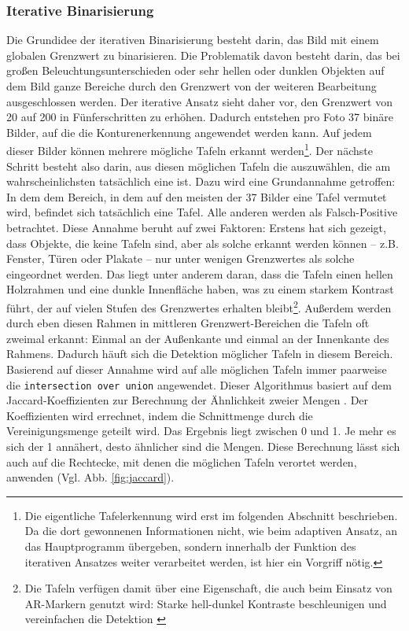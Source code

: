 \subsubsection*{Iterative Binarisierung}

Die Grundidee der iterativen Binarisierung besteht darin, das Bild mit einem globalen Grenzwert zu binarisieren. Die Problematik davon besteht darin, das bei großen Beleuchtungsunterschieden oder sehr hellen oder dunklen Objekten auf dem Bild ganze Bereiche durch den Grenzwert von der weiteren Bearbeitung ausgeschlossen werden. Der iterative Ansatz sieht daher vor, den Grenzwert von 20 auf 200 in Fünferschritten zu erhöhen. Dadurch entstehen pro Foto 37 binäre Bilder, auf die die Konturenerkennung angewendet werden kann. Auf jedem dieser Bilder können mehrere mögliche Tafeln erkannt werden\footnote{Die eigentliche Tafelerkennung wird erst im folgenden Abschnitt beschrieben. Da die dort gewonnenen Informationen nicht, wie beim adaptiven Ansatz, an das Hauptprogramm übergeben, sondern innerhalb der Funktion des iterativen Ansatzes weiter verarbeitet werden, ist hier ein Vorgriff nötig.}. Der nächste Schritt besteht also darin, aus diesen möglichen Tafeln die auszuwählen, die am wahrscheinlichsten tatsächlich eine ist. Dazu wird eine Grundannahme getroffen: In dem dem Bereich, in dem auf den meisten der 37 Bilder eine Tafel vermutet wird, befindet sich tatsächlich eine Tafel. Alle anderen werden als Falsch-Positive betrachtet. Diese Annahme beruht auf zwei Faktoren: Erstens hat sich gezeigt, dass Objekte, die keine Tafeln sind, aber als solche erkannt werden können -- z.B. Fenster, Türen oder Plakate -- nur unter wenigen Grenzwertes als solche eingeordnet werden. Das liegt unter anderem daran, dass die Tafeln einen hellen Holzrahmen und eine dunkle Innenfläche haben, was zu einem starkem Kontrast führt, der auf vielen Stufen des Grenzwertes erhalten bleibt\footnote{Die Tafeln verfügen damit über eine Eigenschaft, die auch beim Einsatz von AR-Markern genutzt wird: Starke hell-dunkel Kontraste beschleunigen und vereinfachen die Detektion \cite[p.~45]{armarker}}. Außerdem werden durch eben diesen Rahmen in mittleren Grenzwert-Bereichen die Tafeln oft zweimal erkannt: Einmal an der Außenkante und einmal an der Innenkante des Rahmens. Dadurch häuft sich die Detektion möglicher Tafeln in diesem Bereich.
Basierend auf dieser Annahme wird auf alle möglichen Tafeln immer paarweise die \verb|intersection over union| angewendet. Dieser Algorithmus basiert auf dem Jaccard-Koeffizienten zur Berechnung der Ähnlichkeit zweier Mengen \cite{intersectionoverunion}. Der Koeffizienten wird errechnet, indem die Schnittmenge durch die Vereinigungsmenge geteilt wird. Das Ergebnis liegt zwischen 0 und 1. Je mehr es sich der 1 annähert, desto ähnlicher sind die Mengen. Diese Berechnung lässt sich auch auf die Rechtecke, mit denen die möglichen Tafeln verortet werden, anwenden (Vgl. Abb. \ref{fig:jaccard}).

